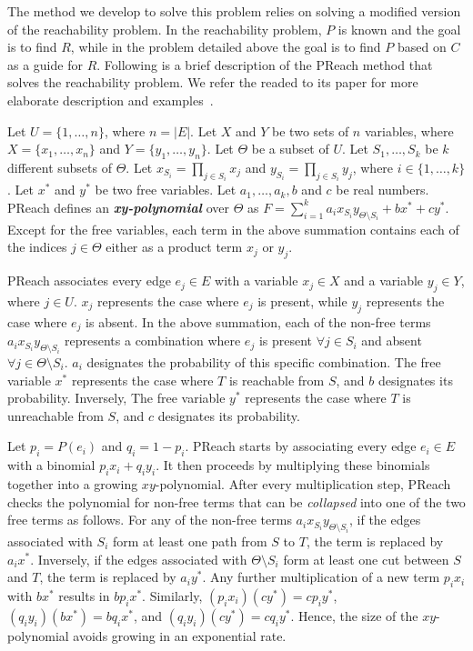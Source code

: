 \documentclass[runningheads,a4paper]{llncs}
\begin{document}
The method we develop to solve this problem relies on solving a modified version
of the reachability problem. In the reachability problem, $P$ is known and the
goal is to find $R$, while in the problem detailed above the goal is to find $P$
based on $C$ as a guide for $R$. Following is a brief description of the PReach
method that solves the reachability problem. We refer the readed to its paper
for more elaborate description and examples~\cite{preach}.

Let $U = \{1, \ldots, n\}$, where $n = |E|$. Let $X$ and $Y$ be two sets of $n$
variables, where $X = \{x_1, \ldots, x_n\}$ and $Y = \{y_1, \ldots, y_n\}$. Let
$\Theta$ be a subset of $U$. Let $S_1, \dots, S_k$ be $k$ different subsets of
$\Theta$. Let $x_{S_i} = \prod_{j \in S_i}x_j$ and $y_{S_i} = \prod_{j \in
S_i}y_j$, where $i \in \{1, \ldots, k\}$. Let $x^*$ and $y^*$ be two free
variables. Let $a_1, \ldots, a_k, b$ and $c$ be real numbers. PReach defines an
\emph{\textbf{xy-polynomial}} over $\Theta$ as $F =
\sum_{i=1}^k{a_i}x_{S_i}y_{\Theta \setminus S_i} + bx^* + cy^*$. Except for the
free variables, each term in the above summation contains each of the indices
$j \in \Theta$ either as a product term $x_j$ or $y_j$.

PReach associates every edge $e_j \in E$ with a variable $x_j \in X$ and a
variable $y_j \in Y$, where $j \in U$. $x_j$ represents the case where $e_j$ is
present, while $y_j$ represents the case where $e_j$ is absent. In the above
summation, each of the non-free terms ${a_i}x_{S_i}y_{\Theta \setminus S_i}$
represents a combination where $e_j$ is present $\forall j \in S_i$ and absent
$\forall j \in \Theta \setminus S_i$. $a_i$ designates the probability of this
specific combination. The free variable $x^*$ represents the case where $T$ is
reachable from $S$, and $b$ designates its probability. Inversely, The free
variable $y^*$ represents the case where $T$ is unreachable from $S$, and $c$
designates its probability.

Let $p_i = P(e_i)$ and $q_i = 1-p_i$. PReach starts by associating every edge
$e_i \in E$ with a binomial $p_i x_i + q_i y_i$. It then proceeds by
multiplying these binomials together into a growing $xy$-polynomial. After every multiplication
step, PReach checks the polynomial for non-free terms that can be
\emph{collapsed} into one of the two free terms as follows. For any of the
non-free terms ${a_i}x_{S_i}y_{\Theta \setminus S_i}$, if the edges associated
with $S_i$ form at least one path from $S$ to $T$, the term is replaced by
$a_i x^*$. Inversely, if the edges associated with ${\Theta \setminus S_i}$ form
at least one cut between $S$ and $T$,  the term is replaced by $a_i y^*$. Any
further multiplication of a new term $p_i x_i$ with $b x^*$ results in $b p_i
x^*$. Similarly, $(p_i x_i)(c y^*) = c p_i y^*$, $(q_i y_i)(b x^*) = b q_i x^*$,
and $(q_i y_i)(c y^*) = c q_i y^*$. Hence, the size of the $xy$-polynomial
avoids growing in an exponential rate.
\end{document}
